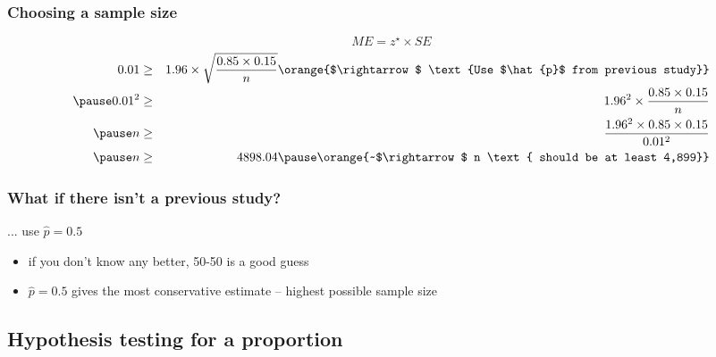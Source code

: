 \documentclass[slidestop,compress,mathserif]{beamer}
\begin{document}

\begin{frame}
\frametitle{Choosing a sample size}

\pause
\[ ME = z^\star \times SE\]
\pause
\begin{eqnarray*}
0.01 &\ge& 1.96 \times \sqrt{\frac{0.85 \times 0.15}{n}} \orange{$\rightarrow$ \text{Use $\hat{p}$ from previous study}} \\
\pause
0.01^2 &\ge& 1.96^2 \times \frac{0.85 \times 0.15}{n} \\
\pause
n &\ge& \frac{1.96^2 \times 0.85 \times 0.15}{0.01^2} \\
\pause
n &\ge& 4898.04 \pause \orange{~$\rightarrow$ n \text{ should be at least 4,899}}
\end{eqnarray*}

\end{frame}


\begin{frame}
\frametitle{What if there isn't a previous study?}

... use $\hat{p} = 0.5$

\vspace{1cm}

\pause

\begin{itemize}
\item if you don't know any better, 50-50 is a good guess
\pause
\item $\hat{p} = 0.5$ gives the most conservative estimate -- highest possible sample size
\end{itemize}

\end{frame}




\subsection{Hypothesis testing for a proportion}
\end{document}
